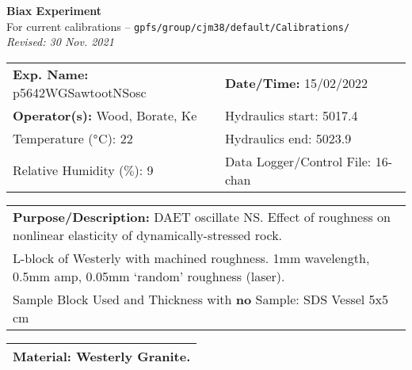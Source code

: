 \documentclass[letterpaper, 10pt]{article}
\begin{document}
\begin{center}
    {\Large \textbf{Biax Experiment}}\\
    {\small For current calibrations -- \texttt{gpfs/group/cjm38/default/Calibrations/}}\\
    {\footnotesize \textit{Revised: 30 Nov. 2021}}
\end{center}



\begin{table}[!ht]
	\renewcommand{\arraystretch}{1.1}
	\begin{tabular}{p{10cm} p{10cm} }
	    \textbf{Exp. Name: }p5642WGSawtootNSosc & \textbf{Date/Time: }15/02/2022\\
	    \textbf{Operator(s): }Wood, Borate, Ke & Hydraulics start: 5017.4 \\
	    Temperature ($\degree$C): 22 & Hydraulics end: 5023.9 \\
	    Relative Humidity ($\%$): 9 & Data Logger/Control File: 16-chan \\
	\end{tabular}
\end{table} 
\vspace{-0.5cm} 

\begin{table}[!ht]
	\renewcommand{\arraystretch}{1.1}
	\begin{tabular}{p{20cm}}\textbf{Purpose/Description:} DAET oscillate NS. Effect of roughness on nonlinear elasticity of dynamically-stressed rock. \\L-block of Westerly with machined roughness. 1mm wavelength, 0.5mm amp, 0.05mm ‘random’ roughness (laser). \\Sample Block Used and Thickness with \textbf{no} Sample: SDS Vessel 5x5 cm \\
	\end{tabular}
    \end{table} \vspace{-0.5cm} 

\begin{table}[!ht]
        \small
        \renewcommand{\arraystretch}{1.2}
        \begin{tabular}{ |p{7cm}| } \hline 
Material: Westerly Granite.  \\ \hline \end{tabular} \end{table} \vspace{-0.5cm} 
\end{document}
